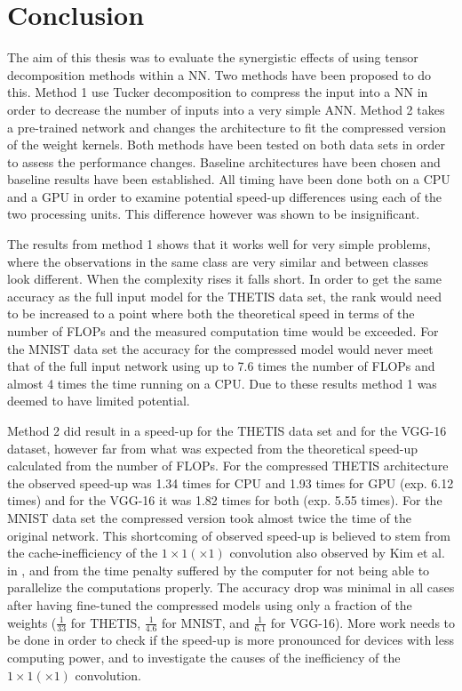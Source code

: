 \section{Conclusion} \label{tex:conclusion}
The aim of this thesis was to evaluate the synergistic effects of using tensor decomposition methods within a NN. Two methods have been proposed to do this. Method 1 use Tucker decomposition to compress the input into a NN in order to decrease the number of inputs into a very simple ANN. Method 2 takes a pre-trained network and changes the architecture to fit the compressed version of the weight kernels. Both methods have been tested on both data sets in order to assess the performance changes. Baseline architectures have been chosen and baseline results have been established. All timing have been done both on a CPU and a GPU in order to examine potential speed-up differences using each of the two processing units. This difference however was shown to be insignificant.

The results from method 1 shows that it works well for very simple problems, where the observations in the same class are very similar and between classes look different. When the complexity rises it falls short. In order to get the same accuracy as the full input model for the THETIS data set, the rank would need to be increased to a point where both the theoretical speed in terms of the number of FLOPs and the measured computation time would be exceeded. For the MNIST data set the accuracy for the compressed model would never meet that of the full input network using up to 7.6 times the number of FLOPs and almost 4 times the time running on a CPU. Due to these results method 1 was deemed to have limited potential.

Method 2 did result in a speed-up for the THETIS data set and for the VGG-16 dataset, however far from what was expected from the theoretical speed-up calculated from the number of FLOPs. For the compressed THETIS architecture the observed speed-up was 1.34 times for CPU and 1.93 times for GPU (exp. 6.12 times) and for the VGG-16 it was 1.82 times for both (exp. 5.55 times). For the MNIST data set the compressed version took almost twice the time of the original network. This shortcoming of observed speed-up is believed to stem from the cache-inefficiency of the $1\times 1 (\times 1)$ convolution also observed by Kim et al. in \cite{Kim2016}, and from the time penalty suffered by the computer for not being able to parallelize the computations properly. The accuracy drop was minimal in all cases after having fine-tuned the compressed models using only a fraction of the weights ($\frac{1}{33}$ for THETIS, $\frac{1}{4.6}$ for MNIST, and $\frac{1}{6.1}$ for VGG-16). More work needs to be done in order to check if the speed-up is more pronounced for devices with less computing power, and to investigate the causes of the inefficiency of the $1\times 1(\times 1)$ convolution.
